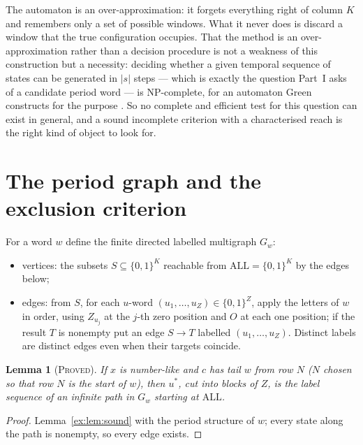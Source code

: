 \documentclass[11pt]{article}
\newtheorem{lemma}[theorem]{Lemma}
\theoremstyle{definition}
\theoremstyle{remark}
\newcommand{\ALL}{\mathrm{ALL}}
\newcommand{\PROVED}{\textsc{Proved}}
\begin{document}
The automaton is an over-approximation: it forgets everything right of column $K$ and remembers only a set of possible windows. What it never does is discard a window that the true configuration occupies. That the method is an over-approximation rather than a decision procedure is not a weakness of this construction but a necessity: deciding whether a given temporal sequence of states can be generated in $|s|$ steps --- which is exactly the question Part~I asks of a candidate period word --- is NP-complete, for an automaton Green constructs for the purpose \cite{Green87}. So no complete and efficient test for this question can exist in general, and a sound incomplete criterion with a characterised reach is the right kind of object to look for.

\section{The period graph and the exclusion criterion}\label{ex:sec:graph}

For a word $w$ define the finite directed labelled multigraph $G_w$:
\begin{itemize}[nosep]
\item vertices: the subsets $S\subseteq\{0,1\}^K$ reachable from $\ALL=\{0,1\}^K$ by the edges below;
\item edges: from $S$, for each $u$-word $(u_1,\dots,u_Z)\in\{0,1\}^Z$, apply the letters of $w$ in order, using $Z_{u_j}$ at the $j$-th zero position and $O$ at each one position; if the result $T$ is nonempty put an edge $S\to T$ labelled $(u_1,\dots,u_Z)$. Distinct labels are distinct edges even when their targets coincide.
\end{itemize}

\begin{lemma}[\PROVED]\label{ex:lem:path}
If $x$ is number-like and $c$ has tail $w$ from row $N$ ($N$ chosen so that row $N$ is the start of $w$), then $u^*$, cut into blocks of $Z$, is the label sequence of an infinite path in $G_w$ starting at $\ALL$.
\end{lemma}
\begin{proof}
Lemma~\ref{ex:lem:sound} with the period structure of $w$; every state along the path is nonempty, so every edge exists.
\end{proof}
\end{document}

